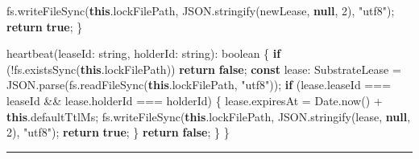 \documentclass[
]{ctexart}
\newenvironment{Shaded}{}{}
\newcommand{\AttributeTok}[1]{\textcolor[rgb]{0.49,0.56,0.16}{#1}}
\newcommand{\BuiltInTok}[1]{\textcolor[rgb]{0.00,0.50,0.00}{#1}}
\newcommand{\ControlFlowTok}[1]{\textcolor[rgb]{0.00,0.44,0.13}{\textbf{#1}}}
\newcommand{\DataTypeTok}[1]{\textcolor[rgb]{0.56,0.13,0.00}{#1}}
\newcommand{\DecValTok}[1]{\textcolor[rgb]{0.25,0.63,0.44}{#1}}
\newcommand{\FunctionTok}[1]{\textcolor[rgb]{0.02,0.16,0.49}{#1}}
\newcommand{\KeywordTok}[1]{\textcolor[rgb]{0.00,0.44,0.13}{\textbf{#1}}}
\newcommand{\NormalTok}[1]{#1}
\newcommand{\OperatorTok}[1]{\textcolor[rgb]{0.40,0.40,0.40}{#1}}
\newcommand{\StringTok}[1]{\textcolor[rgb]{0.25,0.44,0.63}{#1}}
\renewcommand{\_}{\discretionary{}{}{\textunderscore}}
\begin{document}
\begin{Shaded}
\begin{Highlighting}[]
\NormalTok{    fs}\OperatorTok{.}\FunctionTok{writeFileSync}\NormalTok{(}\KeywordTok{this}\OperatorTok{.}\AttributeTok{lockFilePath}\OperatorTok{,} \BuiltInTok{JSON}\OperatorTok{.}\FunctionTok{stringify}\NormalTok{(newLease}\OperatorTok{,} \KeywordTok{null}\OperatorTok{,} \DecValTok{2}\NormalTok{)}\OperatorTok{,} \StringTok{"utf8"}\NormalTok{)}\OperatorTok{;}
    \ControlFlowTok{return} \KeywordTok{true}\OperatorTok{;}
\NormalTok{  \}}

  \FunctionTok{heartbeat}\NormalTok{(leaseId}\OperatorTok{:} \DataTypeTok{string}\OperatorTok{,}\NormalTok{ holderId}\OperatorTok{:} \DataTypeTok{string}\NormalTok{)}\OperatorTok{:} \DataTypeTok{boolean}\NormalTok{ \{}
    \ControlFlowTok{if}\NormalTok{ (}\OperatorTok{!}\NormalTok{fs}\OperatorTok{.}\FunctionTok{existsSync}\NormalTok{(}\KeywordTok{this}\OperatorTok{.}\AttributeTok{lockFilePath}\NormalTok{)) }\ControlFlowTok{return} \KeywordTok{false}\OperatorTok{;}
    \KeywordTok{const}\NormalTok{ lease}\OperatorTok{:}\NormalTok{ SubstrateLease }\OperatorTok{=} \BuiltInTok{JSON}\OperatorTok{.}\FunctionTok{parse}\NormalTok{(fs}\OperatorTok{.}\FunctionTok{readFileSync}\NormalTok{(}\KeywordTok{this}\OperatorTok{.}\AttributeTok{lockFilePath}\OperatorTok{,} \StringTok{"utf8"}\NormalTok{))}\OperatorTok{;}
    \ControlFlowTok{if}\NormalTok{ (lease}\OperatorTok{.}\AttributeTok{leaseId} \OperatorTok{===}\NormalTok{ leaseId }\OperatorTok{\&\&}\NormalTok{ lease}\OperatorTok{.}\AttributeTok{holderId} \OperatorTok{===}\NormalTok{ holderId) \{}
\NormalTok{      lease}\OperatorTok{.}\AttributeTok{expiresAt} \OperatorTok{=} \BuiltInTok{Date}\OperatorTok{.}\FunctionTok{now}\NormalTok{() }\OperatorTok{+} \KeywordTok{this}\OperatorTok{.}\AttributeTok{defaultTtlMs}\OperatorTok{;}
\NormalTok{      fs}\OperatorTok{.}\FunctionTok{writeFileSync}\NormalTok{(}\KeywordTok{this}\OperatorTok{.}\AttributeTok{lockFilePath}\OperatorTok{,} \BuiltInTok{JSON}\OperatorTok{.}\FunctionTok{stringify}\NormalTok{(lease}\OperatorTok{,} \KeywordTok{null}\OperatorTok{,} \DecValTok{2}\NormalTok{)}\OperatorTok{,} \StringTok{"utf8"}\NormalTok{)}\OperatorTok{;}
      \ControlFlowTok{return} \KeywordTok{true}\OperatorTok{;}
\NormalTok{    \}}
    \ControlFlowTok{return} \KeywordTok{false}\OperatorTok{;}
\NormalTok{  \}}
\NormalTok{\}}
\end{Highlighting}
\end{Shaded}

\begin{center}\rule{0.5\linewidth}{0.5pt}\end{center}
\end{document}
